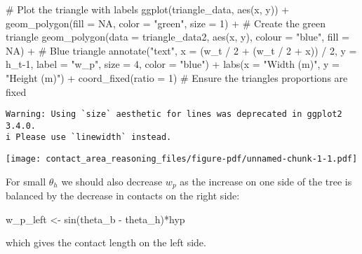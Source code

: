 \documentclass[
  letterpaper,
  DIV=11,
  numbers=noendperiod]{scrartcl}
\newenvironment{Shaded}{\begin{snugshade}}{\end{snugshade}}
\newcommand{\AttributeTok}[1]{\textcolor[rgb]{0.40,0.45,0.13}{#1}}
\newcommand{\CommentTok}[1]{\textcolor[rgb]{0.37,0.37,0.37}{#1}}
\newcommand{\ConstantTok}[1]{\textcolor[rgb]{0.56,0.35,0.01}{#1}}
\newcommand{\DecValTok}[1]{\textcolor[rgb]{0.68,0.00,0.00}{#1}}
\newcommand{\FunctionTok}[1]{\textcolor[rgb]{0.28,0.35,0.67}{#1}}
\newcommand{\NormalTok}[1]{\textcolor[rgb]{0.00,0.23,0.31}{#1}}
\newcommand{\SpecialCharTok}[1]{\textcolor[rgb]{0.37,0.37,0.37}{#1}}
\newcommand{\StringTok}[1]{\textcolor[rgb]{0.13,0.47,0.30}{#1}}
\begin{document}
\begin{Shaded}
\begin{Highlighting}[]
\CommentTok{\# Plot the triangle with labels}
\FunctionTok{ggplot}\NormalTok{(triangle\_data, }\FunctionTok{aes}\NormalTok{(x, y)) }\SpecialCharTok{+}
  \FunctionTok{geom\_polygon}\NormalTok{(}\AttributeTok{fill =} \ConstantTok{NA}\NormalTok{, }\AttributeTok{color =} \StringTok{"green"}\NormalTok{, }\AttributeTok{size =} \DecValTok{1}\NormalTok{) }\SpecialCharTok{+}  \CommentTok{\# Create the green triangle}
  \FunctionTok{geom\_polygon}\NormalTok{(}\AttributeTok{data =}\NormalTok{ triangle\_data2, }\FunctionTok{aes}\NormalTok{(x, y), }\AttributeTok{colour =} \StringTok{"blue"}\NormalTok{, }\AttributeTok{fill =} \ConstantTok{NA}\NormalTok{) }\SpecialCharTok{+}  \CommentTok{\# Blue triangle}
  \FunctionTok{annotate}\NormalTok{(}\StringTok{"text"}\NormalTok{, }\AttributeTok{x =}\NormalTok{ (w\_t }\SpecialCharTok{/} \DecValTok{2} \SpecialCharTok{+}\NormalTok{ (w\_t }\SpecialCharTok{/} \DecValTok{2} \SpecialCharTok{+}\NormalTok{ x)) }\SpecialCharTok{/} \DecValTok{2}\NormalTok{, }\AttributeTok{y =}\NormalTok{ h\_t}\DecValTok{{-}1}\NormalTok{, }\AttributeTok{label =} \StringTok{"w\_p"}\NormalTok{, }\AttributeTok{size =} \DecValTok{4}\NormalTok{, }\AttributeTok{color =} \StringTok{"blue"}\NormalTok{) }\SpecialCharTok{+}
  \FunctionTok{labs}\NormalTok{(}\AttributeTok{x =} \StringTok{"Width (m)"}\NormalTok{, }\AttributeTok{y =} \StringTok{"Height (m)"}\NormalTok{) }\SpecialCharTok{+}
  \FunctionTok{coord\_fixed}\NormalTok{(}\AttributeTok{ratio =} \DecValTok{1}\NormalTok{)  }\CommentTok{\# Ensure the triangle\textquotesingle{}s proportions are fixed}
\end{Highlighting}
\end{Shaded}

\begin{verbatim}
Warning: Using `size` aesthetic for lines was deprecated in ggplot2 3.4.0.
i Please use `linewidth` instead.
\end{verbatim}

\texttt{[image: contact\_area\_reasoning\_files/figure-pdf/unnamed-chunk-1-1.pdf]}

For small \(\theta_h\) we should also decrease \(w_p\) as the increase
on one side of the tree is balanced by the decrease in contacts on the
right side:

w\_p\_left \textless- sin(theta\_b - theta\_h)*hyp

which gives the contact length on the left side.
\end{document}
